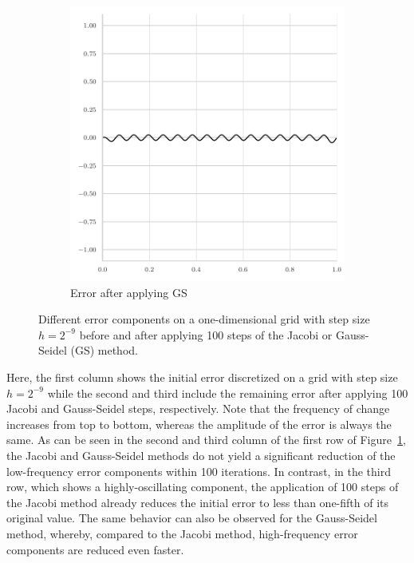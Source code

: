 \begin{figure}[ht!]
\begin{subfigure}[t]{0.32\textwidth}
		\includegraphics[width=\textwidth]{figures/error_plots//final_error_gauss_seidel_32pi.pdf}
	\caption{Error after applying GS}
	\end{subfigure}
	\caption[Different error components on a one-dimensional grid with step size $h = 2^{-9}$.]{Different error components on a one-dimensional grid with step size $h = 2^{-9}$ before and after applying 100 steps of the Jacobi or Gauss-Seidel (GS) method.}
	\label{fig:different-error-components}
\end{figure}
Here, the first column shows the initial error discretized on a grid with step size $h = 2^{-9}$ while the second and third include the remaining error after applying 100 Jacobi and Gauss-Seidel steps, respectively.
Note that the frequency of change increases from top to bottom, whereas the amplitude of the error is always the same.
As can be seen in the second and third column of the first row of Figure~\ref{fig:different-error-components}, the Jacobi and Gauss-Seidel methods do not yield a significant reduction of the low-frequency error components within 100 iterations.
In contrast, in the third row, which shows a highly-oscillating component, the application of 100 steps of the Jacobi method already reduces the initial error to less than one-fifth of its original value.
The same behavior can also be observed for the Gauss-Seidel method, whereby, compared to the Jacobi method, high-frequency error components are reduced even faster.
